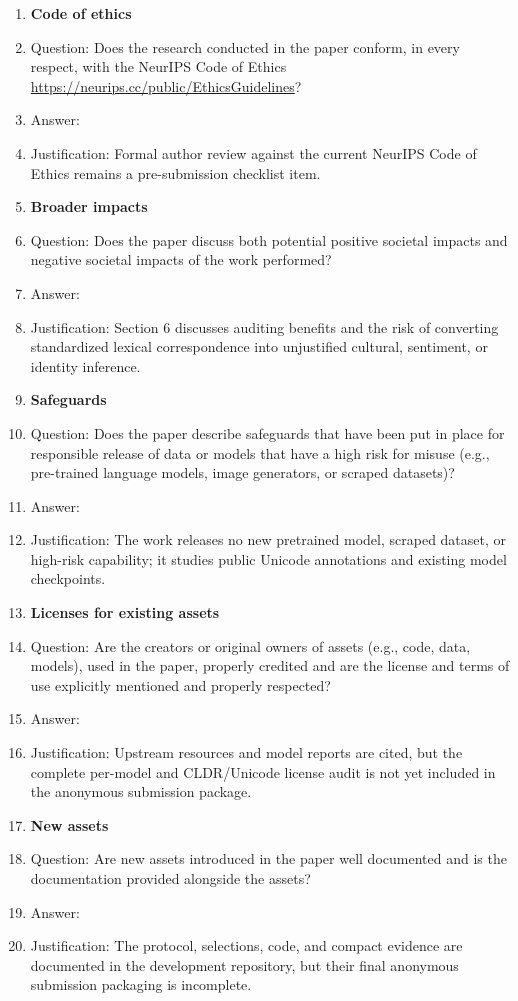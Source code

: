 \begin{enumerate}
\item {\bf Code of ethics}
  \item[] Question: Does the research conducted in the paper conform, in every respect, with the NeurIPS Code of Ethics \url{https://neurips.cc/public/EthicsGuidelines}?
  \item[] Answer: \answerNA{}
  \item[] Justification: Formal author review against the current NeurIPS Code of Ethics remains a pre-submission checklist item.

\item {\bf Broader impacts}
  \item[] Question: Does the paper discuss both potential positive societal impacts and negative societal impacts of the work performed?
  \item[] Answer: \answerYes{}
  \item[] Justification: Section 6 discusses auditing benefits and the risk of converting standardized lexical correspondence into unjustified cultural, sentiment, or identity inference.

\item {\bf Safeguards}
  \item[] Question: Does the paper describe safeguards that have been put in place for responsible release of data or models that have a high risk for misuse (e.g., pre-trained language models, image generators, or scraped datasets)?
  \item[] Answer: \answerNA{}
  \item[] Justification: The work releases no new pretrained model, scraped dataset, or high-risk capability; it studies public Unicode annotations and existing model checkpoints.

\item {\bf Licenses for existing assets}
  \item[] Question: Are the creators or original owners of assets (e.g., code, data, models), used in the paper, properly credited and are the license and terms of use explicitly mentioned and properly respected?
  \item[] Answer: \answerNo{}
  \item[] Justification: Upstream resources and model reports are cited, but the complete per-model and CLDR/Unicode license audit is not yet included in the anonymous submission package.

\item {\bf New assets}
  \item[] Question: Are new assets introduced in the paper well documented and is the documentation provided alongside the assets?
  \item[] Answer: \answerNo{}
  \item[] Justification: The protocol, selections, code, and compact evidence are documented in the development repository, but their final anonymous submission packaging is incomplete.


\end{enumerate}
